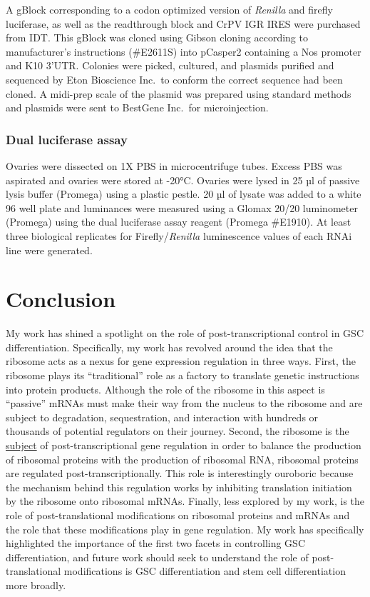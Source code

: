\documentclass[12pt,oneside]{reedthesis}
\begin{document}
A gBlock corresponding to a codon optimized version of \emph{Renilla} and
firefly luciferase, as well as the readthrough block and CrPV IGR IRES
were purchased from IDT. This gBlock was cloned using Gibson cloning
according to manufacturer's instructions (\#E2611S) into pCasper2
containing a Nos promoter and K10 3'UTR. Colonies were picked, cultured,
and plasmids purified and sequenced by Eton Bioscience Inc.~to conform
the correct sequence had been cloned. A midi-prep scale of the plasmid
was prepared using standard methods and plasmids were sent to BestGene
Inc.~for microinjection.

\hypertarget{dual-luciferase-assay}{%
\subsection{Dual luciferase assay}\label{dual-luciferase-assay}}

Ovaries were dissected on 1X PBS in microcentrifuge tubes. Excess PBS
was aspirated and ovaries were stored at -20°C. Ovaries were lysed in 25
µl of passive lysis buffer (Promega) using a plastic pestle. 20 µl of
lysate was added to a white 96 well plate and luminances were measured
using a Glomax 20/20 luminometer (Promega) using the dual luciferase
assay reagent (Promega \#E1910). At least three biological replicates
for Firefly/\emph{Renilla} luminescence values of each RNAi line were
generated.

\setlength\parindent{24pt}

\hypertarget{conclusion}{%
\chapter{Conclusion}\label{conclusion}}

My work has shined a spotlight on the role of post-transcriptional control in GSC differentiation. Specifically, my work has revolved around the idea that the ribosome acts as a nexus for gene expression regulation in three ways. First, the ribosome plays its ``traditional'' role as a factory to translate genetic instructions into protein products. Although the role of the ribosome in this aspect is ``passive'' mRNAs must make their way from the nucleus to the ribosome and are subject to degradation, sequestration, and interaction with hundreds or thousands of potential regulators on their journey. Second, the ribosome is the \underline{subject} of post-transcriptional gene regulation in order to balance the production of ribosomal proteins with the production of ribosomal RNA, ribosomal proteins are regulated post-transcriptionally. This role is interestingly ouroboric because the mechanism behind this regulation works by inhibiting translation initiation by the ribosome onto ribosomal mRNAs. Finally, less explored by my work, is the role of post-translational modifications on ribosomal proteins and mRNAs and the role that these modifications play in gene regulation. My work has specifically highlighted the importance of the first two facets in controlling GSC differentiation, and future work should seek to understand the role of post-translational modifications is GSC differentiation and stem cell differentiation more broadly.
\end{document}
